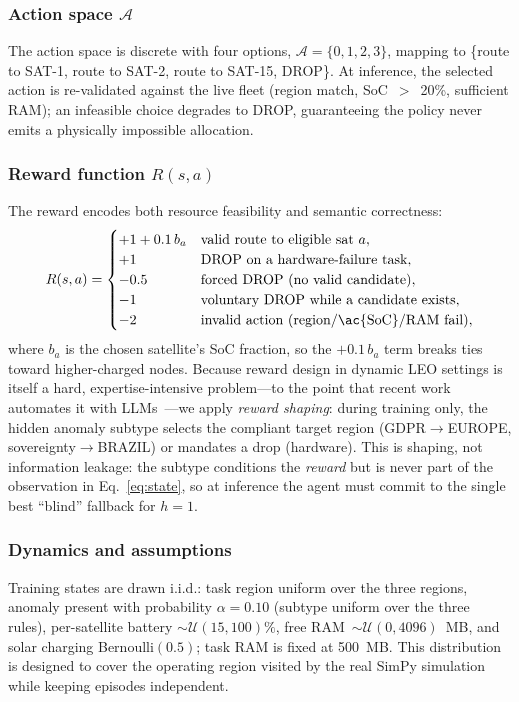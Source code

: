 \documentclass[conference,comsoc,twoside,caption=false]{IEEEtran}
\theoremstyle{definition}
\begin{document}
\subsubsection*{Action space $\mathcal{A}$}
The action space is discrete with four options,
$\mathcal{A} = \{0,1,2,3\}$, mapping to \{route to SAT-1, route to SAT-2, route
to SAT-15, DROP\}. At inference, the selected action is re-validated against the
live fleet (region match, \ac{SoC}~$>$~20\%, sufficient RAM); an infeasible
choice degrades to DROP, guaranteeing the policy never emits a physically
impossible allocation.

\subsubsection*{Reward function $R(s,a)$}
The reward encodes both resource feasibility and semantic correctness:
\begin{equation}
R(s,a) =
\begin{cases}
+1 + 0.1\,b_a & \text{valid route to eligible sat } a,\\
+1 & \text{DROP on a hardware-failure task},\\
-0.5 & \text{forced DROP (no valid candidate)},\\
-1 & \text{voluntary DROP while a candidate exists},\\
-2 & \text{invalid action (region/\ac{SoC}/RAM fail)},
\end{cases}
\label{eq:reward}
\end{equation}
where $b_a$ is the chosen satellite's \ac{SoC} fraction, so the $+0.1\,b_a$ term
breaks ties toward higher-charged nodes. Because reward design in dynamic
\ac{LEO} settings is itself a hard, expertise-intensive problem---to the point
that recent work automates it with LLMs~\cite{casas2026}---we apply
\emph{reward shaping}: during training only, the hidden anomaly subtype selects
the compliant target region (GDPR$\rightarrow$EUROPE, sovereignty$\rightarrow$BRAZIL)
or mandates a drop (hardware). This is shaping, not information leakage: the
subtype conditions the \emph{reward} but is never part of the observation in
Eq.~\eqref{eq:state}, so at inference the agent must commit to the single best
``blind'' fallback for $h=1$.

\subsubsection*{Dynamics and assumptions}
Training states are drawn i.i.d.: task region uniform over the three regions,
anomaly present with probability $\alpha = 0.10$ (subtype uniform over the three
rules), per-satellite battery $\sim\mathcal{U}(15,100)\%$, free
RAM~$\sim\mathcal{U}(0,4096)$~MB, and solar charging Bernoulli$(0.5)$; task RAM
is fixed at 500~MB. This distribution is designed to cover the operating region
visited by the real SimPy simulation while keeping episodes independent.
\end{document}

